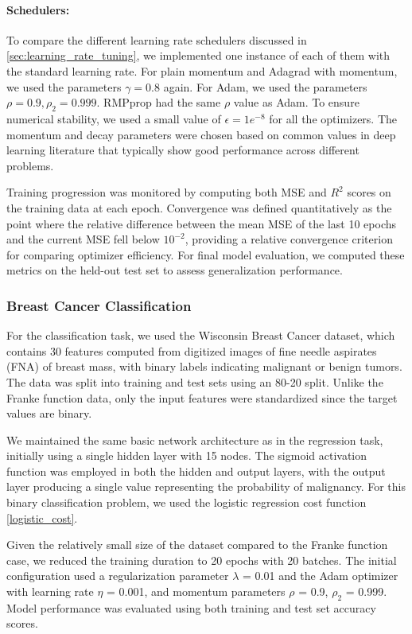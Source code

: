 \paragraph*{Schedulers:}\label{subsec:nn_schedulers}
To compare the different learning rate schedulers discussed in \cref{sec:learning_rate_tuning}, we implemented one instance of each of them with the standard learning rate. For plain momentum and Adagrad with momentum, we used the parameters \( \gamma = 0.8 \) again. For Adam, we used the parameters \( \rho = 0.9, \rho_2 = 0.999 \). RMPprop had the same \( \rho \) value as Adam. To ensure numerical stability, we used a small value of \( \epsilon = 1e^{-8} \) for all the optimizers. The momentum and decay parameters were chosen based on common values in deep learning literature that typically show good performance across different problems. %

Training progression was monitored by computing both MSE and \( R^2 \) scores on the training data at each epoch. Convergence was defined quantitatively as the point where the relative difference between the mean MSE of the last 10 epochs and the current MSE fell below \( 10^{-2} \), providing a relative convergence criterion for comparing optimizer efficiency. For final model evaluation, we computed these metrics on the held-out test set to assess generalization performance.
\subsubsection{Breast Cancer Classification}

For the classification task, we used the Wisconsin Breast Cancer dataset, which contains 30 features computed from digitized images of fine needle aspirates (FNA) of breast mass, with binary labels indicating malignant or benign tumors. The data was split into training and test sets using an 80-20 split. Unlike the Franke function data, only the input features were standardized since the target values are binary.

We maintained the same basic network architecture as in the regression task, initially using a single hidden layer with 15 nodes. The sigmoid activation function was employed in both the hidden and output layers, with the output layer producing a single value representing the probability of malignancy. For this binary classification problem, we used the logistic regression cost function \cref{logistic_cost}.

Given the relatively small size of the dataset compared to the Franke function case, we reduced the training duration to 20 epochs with 20 batches. The initial configuration used a regularization parameter \( \lambda \) = 0.01 and the Adam optimizer with learning rate \( \eta \) = 0.001, and momentum parameters \( \rho \) = 0.9, \( \rho_2 \) = 0.999. Model performance was evaluated using both training and test set accuracy scores.

